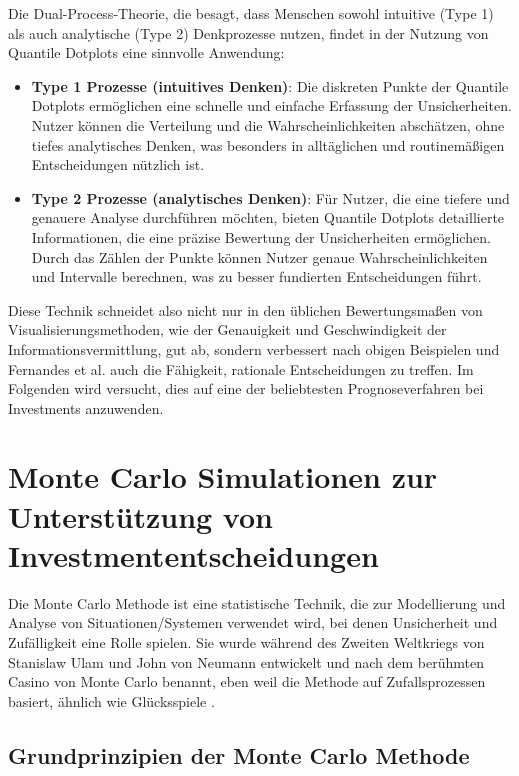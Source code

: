 Die Dual-Process-Theorie, die besagt, dass Menschen sowohl intuitive (Type 1) als auch analytische (Type 2) Denkprozesse nutzen, findet in der Nutzung von Quantile Dotplots eine sinnvolle Anwendung:

\begin{itemize}
    \item \textbf{Type 1 Prozesse (intuitives Denken)}: Die diskreten Punkte der Quantile Dotplots ermöglichen eine schnelle und einfache Erfassung der Unsicherheiten. Nutzer können die Verteilung und die Wahrscheinlichkeiten abschätzen, ohne tiefes analytisches Denken, was besonders in alltäglichen und routinemäßigen Entscheidungen nützlich ist.
    \item \textbf{Type 2 Prozesse (analytisches Denken)}: Für Nutzer, die eine tiefere und genauere Analyse durchführen möchten, bieten Quantile Dotplots detaillierte Informationen, die eine präzise Bewertung der Unsicherheiten ermöglichen. Durch das Zählen der Punkte können Nutzer genaue Wahrscheinlichkeiten und Intervalle berechnen, was zu besser fundierten Entscheidungen führt.
\end{itemize}

Diese Technik schneidet also nicht nur in den üblichen Bewertungsmaßen von Visualisierungsmethoden, wie der Genauigkeit und Geschwindigkeit der Informationsvermittlung, gut ab, sondern verbessert nach obigen Beispielen und Fernandes et al. \cite{Fernandes2018} auch die Fähigkeit, rationale Entscheidungen zu treffen. Im Folgenden wird versucht, dies auf eine der beliebtesten Prognoseverfahren bei Investments anzuwenden.

\section{Monte Carlo Simulationen zur Unterstützung von Investmententscheidungen}

Die Monte Carlo Methode ist eine statistische Technik, die zur Modellierung und Analyse von Situationen/Systemen verwendet wird, bei denen Unsicherheit und Zufälligkeit eine Rolle spielen. Sie wurde während des Zweiten Weltkriegs von Stanislaw Ulam und John von Neumann entwickelt und nach dem berühmten Casino von Monte Carlo benannt, eben weil die Methode auf Zufallsprozessen basiert, ähnlich wie Glücksspiele \cite{Walter2014}.

\subsection{Grundprinzipien der Monte Carlo Methode}


